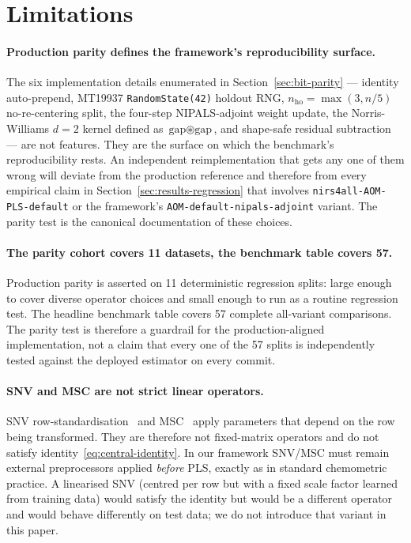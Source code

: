 \documentclass[review,a4paper]{elsarticle}
\newcommand{\PLS}{\textsc{PLS}\xspace}
\newcommand{\NIPALS}{\textsc{NIPALS}\xspace}
\begin{document}
\section{Limitations}\label{sec:limitations}

\paragraph{Production parity defines the framework's reproducibility surface.}
The six implementation details enumerated in Section~\ref{sec:bit-parity}
--- identity auto-prepend, MT19937 \verb|RandomState(42)| holdout RNG,
$n_\text{ho}=\max(3, n/5)$ no-re-centering split, the four-step
\NIPALS-adjoint weight update, the Norris-Williams $d{=}2$ kernel
defined as $\text{gap}\circledast\text{gap}$, and shape-safe residual
subtraction --- are not features. They are the surface on which the
benchmark's reproducibility rests. An independent reimplementation
that gets any one of them wrong will deviate from the production
reference and therefore from every empirical claim in
Section~\ref{sec:results-regression} that involves
\verb|nirs4all-AOM-PLS-default| or the framework's
\texttt{AOM-default-nipals-adjoint} variant. The parity test is the canonical
documentation of these choices.

\paragraph{The parity cohort covers 11 datasets, the benchmark table covers 57.}
Production parity is asserted on 11 deterministic regression splits:
large enough to cover diverse operator choices and small enough to run
as a routine regression test. The headline benchmark table covers 57
complete all-variant comparisons. The parity test is therefore a
guardrail for the production-aligned implementation, not a claim that
every one of the 57 splits is independently tested against the deployed
estimator on every commit.

\paragraph{SNV and MSC are not strict linear operators.}
SNV row-standardisation~\cite{barnes1989standard} and
MSC~\cite{geladi1985linearization} apply parameters that depend on the
row being transformed. They are therefore not fixed-matrix operators
and do not satisfy identity~\eqref{eq:central-identity}. In our
framework SNV/MSC must remain external preprocessors applied
\emph{before} \PLS, exactly as in standard chemometric practice. A
linearised SNV (centred per row but with a fixed scale factor learned
from training data) would satisfy the identity but would be a
different operator and would behave differently on test data; we do
not introduce that variant in this paper.
\end{document}
